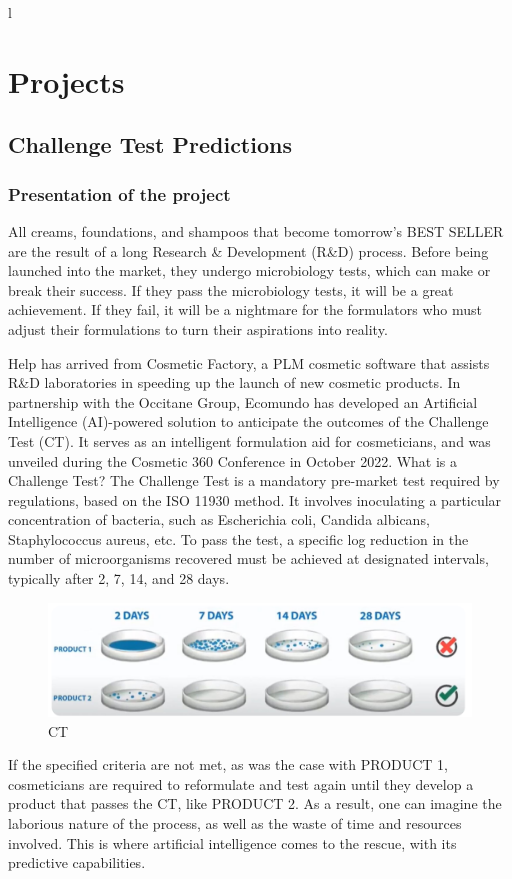 l\documentclass[a4paper,12pt,twoside]{report}
\begin{document}
\chapter{Projects}
\thispagestyle{empty}
\section{Challenge Test Predictions}
\subsection{Presentation of the project}
All creams, foundations, and shampoos that become tomorrow's BEST SELLER are the result of a long Research \& Development (R\&D) process. Before being launched into the market, they undergo microbiology tests, which can make or break their success. If they pass the microbiology tests, it will be a great achievement. If they fail, it will be a nightmare for the formulators who must adjust their formulations to turn their aspirations into reality.

Help has arrived from Cosmetic Factory, a PLM cosmetic software that assists R\&D laboratories in speeding up the launch of new cosmetic products. In partnership with the Occitane Group, Ecomundo has developed an Artificial Intelligence (AI)-powered solution to anticipate the outcomes of the Challenge Test (CT). It serves as an intelligent formulation aid for cosmeticians, and was unveiled during the Cosmetic 360 Conference in October 2022. 
What is a Challenge Test? The Challenge Test is a mandatory pre-market test required by regulations, based on the ISO 11930 method. It involves inoculating a particular concentration of bacteria, such as Escherichia coli, Candida albicans, Staphylococcus aureus, etc. To pass the test, a specific log reduction in the number of microorganisms recovered must be achieved at designated intervals, typically after 2, 7, 14, and 28 days.
\begin{figure}[H]
		\includegraphics[width=\textwidth]{images/CT}
	\caption[Challenge Test]{CT}
\end{figure}

If the specified criteria are not met, as was the case with PRODUCT 1, cosmeticians are required to reformulate and test again until they develop a product that passes the CT, like PRODUCT 2. As a result, one can imagine the laborious nature of the process, as well as the waste of time and resources involved. This is where artificial intelligence comes to the rescue, with its predictive capabilities.
\end{document}
